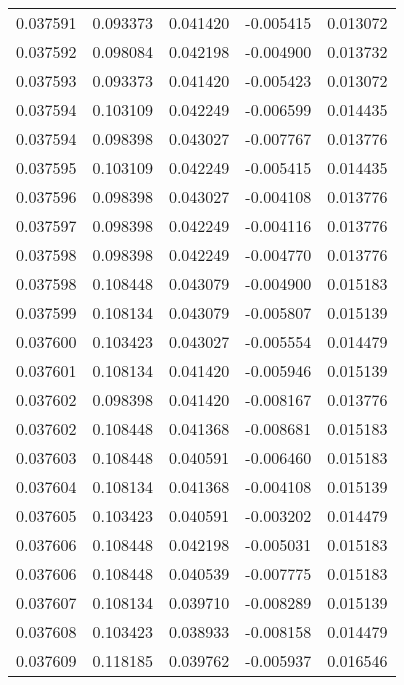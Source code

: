\begin{tabular}{lrrrr}
0.037591    &  0.093373 &  0.041420 & -0.005415 &             0.013072 \\
0.037592    &  0.098084 &  0.042198 & -0.004900 &             0.013732 \\
0.037593    &  0.093373 &  0.041420 & -0.005423 &             0.013072 \\
0.037594    &  0.103109 &  0.042249 & -0.006599 &             0.014435 \\
0.037594    &  0.098398 &  0.043027 & -0.007767 &             0.013776 \\
0.037595    &  0.103109 &  0.042249 & -0.005415 &             0.014435 \\
0.037596    &  0.098398 &  0.043027 & -0.004108 &             0.013776 \\
0.037597    &  0.098398 &  0.042249 & -0.004116 &             0.013776 \\
0.037598    &  0.098398 &  0.042249 & -0.004770 &             0.013776 \\
0.037598    &  0.108448 &  0.043079 & -0.004900 &             0.015183 \\
0.037599    &  0.108134 &  0.043079 & -0.005807 &             0.015139 \\
0.037600    &  0.103423 &  0.043027 & -0.005554 &             0.014479 \\
0.037601    &  0.108134 &  0.041420 & -0.005946 &             0.015139 \\
0.037602    &  0.098398 &  0.041420 & -0.008167 &             0.013776 \\
0.037602    &  0.108448 &  0.041368 & -0.008681 &             0.015183 \\
0.037603    &  0.108448 &  0.040591 & -0.006460 &             0.015183 \\
0.037604    &  0.108134 &  0.041368 & -0.004108 &             0.015139 \\
0.037605    &  0.103423 &  0.040591 & -0.003202 &             0.014479 \\
0.037606    &  0.108448 &  0.042198 & -0.005031 &             0.015183 \\
0.037606    &  0.108448 &  0.040539 & -0.007775 &             0.015183 \\
0.037607    &  0.108134 &  0.039710 & -0.008289 &             0.015139 \\
0.037608    &  0.103423 &  0.038933 & -0.008158 &             0.014479 \\
0.037609    &  0.118185 &  0.039762 & -0.005937 &             0.016546 \\

\end{tabular}
